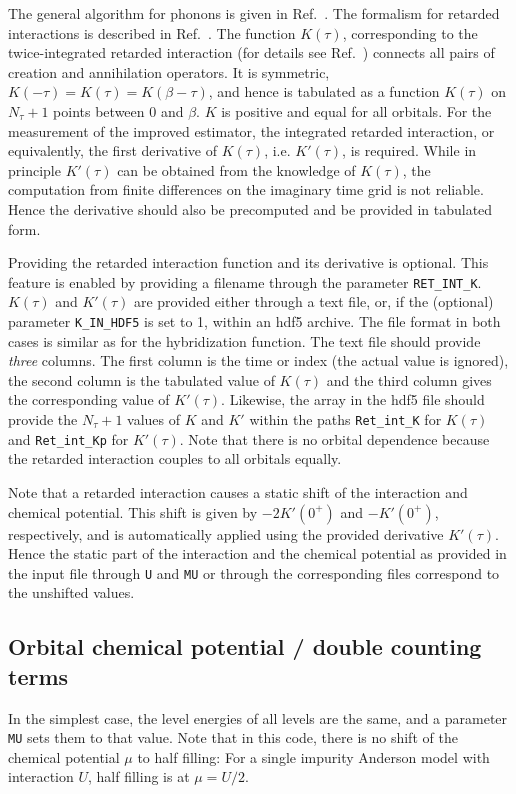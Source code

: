 \documentclass[aps,prb,floatfix,superscriptaddress,twocolumn,notitlepage]{revtex4-1}
\begin{document}
The general algorithm for phonons is given in Ref.~. The formalism for retarded interactions is described in Ref.~. The function $K(\tau)$, corresponding to the twice-integrated retarded interaction (for details see Ref.~) connects all pairs of creation and annihilation operators. It is symmetric, $K(-\tau)=K(\tau)=K(\beta-\tau)$, and hence is tabulated as a function $K(\tau)$ on $N_{\tau}+1$ points between $0$ and $\beta$. $K$ is positive and equal for all orbitals.
For the measurement of the improved estimator, the integrated retarded interaction, or equivalently, the first derivative of $K(\tau)$, i.e. $K'(\tau)$, is required. While in principle $K'(\tau)$ can be obtained from the knowledge of $K(\tau)$, the computation from finite differences on the imaginary time grid is not reliable. Hence the derivative should also be precomputed and be provided in tabulated form.

Providing the retarded interaction function and its derivative is optional. This feature is enabled by providing a filename through the parameter \verb#RET_INT_K#.
$K(\tau)$ and $K'(\tau)$ are provided either through a text file, or, if the (optional) parameter \verb#K_IN_HDF5# is set to 1, within an hdf5 archive.
The file format in both cases is similar as for the hybridization function. The text file should provide \emph{three} columns. The first column is the time or index (the actual value is ignored), the second column is the tabulated value of $K(\tau)$ and the third column gives the corresponding value of $K'(\tau)$.
Likewise, the array in the hdf5 file should provide the $N_{\tau}+1$ values of $K$ and $K'$ within the paths \verb#Ret_int_K# for $K(\tau)$ and \verb#Ret_int_Kp# for $K'(\tau)$.
Note that there is no orbital dependence because the retarded interaction couples to all orbitals equally.

Note that a retarded interaction causes a static shift of the interaction and chemical potential. This shift is given by $-2K'(0^{+})$ and $-K'(0^{+})$, respectively, and is automatically applied using the provided derivative $K'(\tau)$. Hence the static part of the interaction and the chemical potential as provided in the input file through \verb#U# and \verb#MU# or through the corresponding files correspond to the unshifted values.

\subsection{Orbital chemical potential / double counting terms}
\label{sec:mu}
In the simplest case, the level energies of all levels are the same, and a parameter \verb#MU# sets them to that value. Note that in this code, there is no shift of the chemical potential $\mu$ to half filling: For a single impurity Anderson model with interaction $U$, half filling is at $\mu=U/2$.
\end{document}
